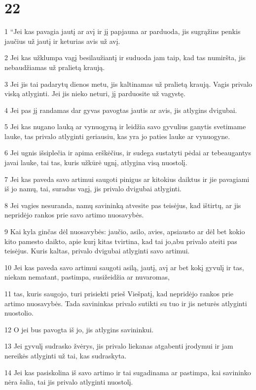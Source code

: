 \chapter{22}


\par 1 “Jei kas pavagia jautį ar avį ir jį papjauna ar parduoda, jis sugrąžins penkis jaučius už jautį ir keturias avis už avį. 
\par 2 Jei kas užklumpa vagį besilaužiantį ir suduoda jam taip, kad tas numiršta, jis nebaudžiamas už pralietą kraują. 
\par 3 Jei jis tai padarytų dienos metu, jis kaltinamas už pralietą kraują. Vagis privalo viską atlyginti. Jei jis nieko neturi, jį parduosite už vagystę. 
\par 4 Jei pas jį randamas dar gyvas pavogtas jautis ar avis, jis atlygins dvigubai. 
\par 5 Jei kas nugano lauką ar vynuogyną ir leidžia savo gyvulius ganytis svetimame lauke, tas privalo atlyginti geriausiu, kas yra jo paties lauke ar vynuogyne. 
\par 6 Jei ugnis išsiplečia ir apima erškėčius, ir sudega sustatyti pėdai ar tebeaugantys javai lauke, tai tas, kuris užkūrė ugnį, atlygina visą nuostolį. 
\par 7 Jei kas paveda savo artimui saugoti pinigus ar kitokius daiktus ir jie pavagiami iš jo namų, tai, suradus vagį, jis privalo dvigubai atlyginti. 
\par 8 Jei vagies nesuranda, namų savininką atvesite pas teisėjus, kad ištirtų, ar jis nepridėjo rankos prie savo artimo nuosavybės. 
\par 9 Kai kyla ginčas dėl nuosavybės: jaučio, asilo, avies, apsiausto ar dėl bet kokio kito pamesto daikto, apie kurį kitas tvirtina, kad tai jo,­abu privalo ateiti pas teisėjus. Kuris kaltas, privalo dvigubai atlyginti savo artimui. 
\par 10 Jei kas paveda savo artimui saugoti asilą, jautį, avį ar bet kokį gyvulį ir tas, niekam nematant, pastimpa, susižeidžia ar nuvaromas, 
\par 11 tas, kuris saugojo, turi prisiekti prieš Viešpatį, kad nepridėjo rankos prie artimo nuosavybės. Tada savininkas privalo sutikti su tuo ir jis neturės atlyginti nuostolio. 
\par 12 O jei bus pavogta iš jo, jis atlygins savininkui. 
\par 13 Jei gyvulį sudrasko žvėrys, jis privalo liekanas atgabenti įrodymui ir jam nereikės atlyginti už tai, kas sudraskyta. 
\par 14 Jei kas pasiskolina iš savo artimo ir tai sugadinama ar pastimpa, kai savininko nėra šalia, tai jis privalo atlyginti nuostolį. 
